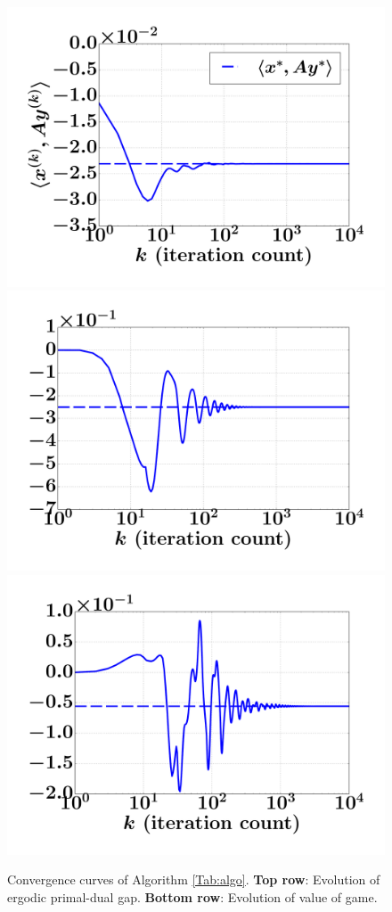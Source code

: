 \documentclass{article} %
\begin{document}
\begin{figure}[!htpb]
  \hspace{-2em}
  \hspace{-2em}
  \vspace{-1em}
  \hspace{-1em}
  \includegraphics[width=.34\linewidth]{simplex_NE.pdf}
  \hspace{-1em}
  \includegraphics[width=.33\linewidth]{SimplifiedPoker_NE.pdf}
  \hspace{-1em}
  \includegraphics[width=.33\linewidth]{Kuhn3112_NE.pdf}
  \caption{Convergence curves of Algorithm
    \ref{Tab:algo}. \textbf{Top row}: Evolution of ergodic
    primal-dual gap. \textbf{Bottom row}: Evolution of
    value of game.}
  \label{Tab:dgap_curve}
\end{figure}
\end{document}
